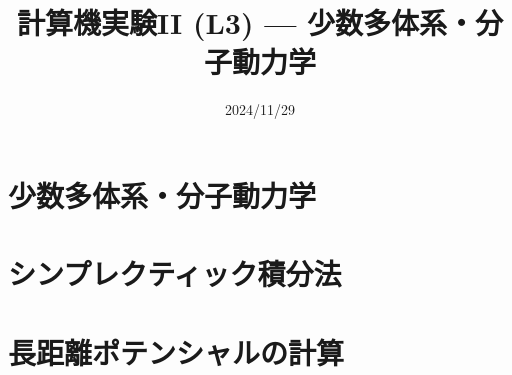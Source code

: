 \documentclass[10pt,dvipdfmx]{beamer}
\title{計算機実験II (L3) --- 少数多体系・分子動力学}
\date{2024/11/29}
\begin{document}
\begin{frame}
  \titlepage
  \tableofcontents
\end{frame}

\section{少数多体系・分子動力学}




%

%




\section{シンプレクティック積分法}
















%
%

\section{長距離ポテンシャルの計算}
\end{document}
